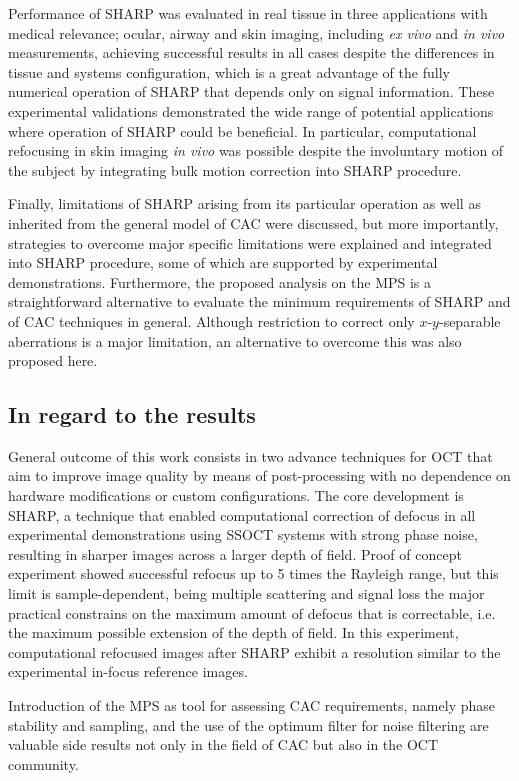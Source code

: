 Performance of SHARP was evaluated in real tissue in three applications with medical relevance; ocular, airway and skin imaging, including \textit{ex vivo} and \textit{in vivo} measurements, achieving successful results in all cases despite the differences in tissue and systems configuration, which is a great advantage of the fully numerical operation of SHARP that depends only on signal information. These experimental validations demonstrated the wide range of potential applications where operation of SHARP could be beneficial. In particular, computational refocusing in skin imaging \textit{in vivo} was possible despite the involuntary motion of the subject by integrating bulk motion correction into SHARP procedure.

Finally, limitations of SHARP arising from its particular operation as well as inherited from the general model of CAC were discussed, but more importantly, strategies to overcome major specific limitations were explained and integrated into SHARP procedure, some of which are supported by experimental demonstrations. Furthermore, the proposed analysis on the MPS is a straightforward alternative to evaluate the minimum requirements of SHARP and of CAC techniques in general. Although restriction to correct only $x$-$y$-separable aberrations is a major limitation, an alternative to overcome this was also proposed here.

\subsection{In regard to the results}

General outcome of this work consists in two advance techniques for OCT that aim to improve image quality by means of post-processing with no dependence on hardware modifications or custom configurations. The core development is SHARP, a technique that enabled computational correction of defocus in all experimental demonstrations using SSOCT systems with strong phase noise, resulting in sharper images across a larger depth of field. Proof of concept experiment showed successful refocus up to 5 times the Rayleigh range, but this limit is sample-dependent, being multiple scattering and signal loss the major practical constrains on the maximum amount of defocus that is correctable, i.e. the maximum possible extension of the depth of field. In this experiment, computational refocused images after SHARP exhibit a resolution similar to the experimental in-focus reference images.

Introduction of the MPS as tool for assessing CAC requirements, namely phase stability and sampling, and the use of the optimum filter for noise filtering are valuable side results not only in the field of CAC but also in the OCT community.


